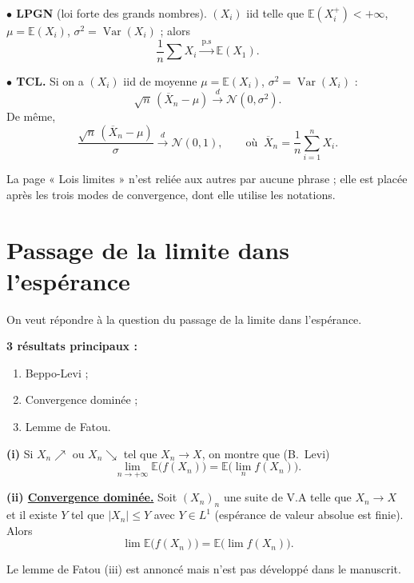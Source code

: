 \documentclass[11pt,a4paper]{article}
\newcommand{\EE}{\mathbb{E}}
\DeclareMathOperator{\Var}{Var}
\begin{document}
\textbf{\color{bleu}$\bullet$ LPGN} (loi forte des grands nombres). $(X_i)$ iid telle que $\EE(X_i^{+})<+\infty$, $\mu=\EE(X_i)$, $\sigma^2=\Var(X_i)$ ; alors
\[
  \frac1n\sum X_i\xrightarrow{\ \text{p.s}\ }\EE(X_1).
\]

\textbf{\color{bleu}$\bullet$ TCL.} Si on a $(X_i)$ iid de moyenne $\mu=\EE(X_i)$, $\sigma^2=\Var(X_i)$ :
\[
  \sqrt n\,(\overline X_n-\mu)\xrightarrow{\ d\ }\mathcal N(0,\sigma^2).
\]
De même,
\[
  \frac{\sqrt n\,(\overline X_n-\mu)}{\sigma}\xrightarrow{\ d\ }\mathcal N(0,1),\qquad\text{où }\ \overline X_n=\frac1n\sum_{i=1}^{n}X_i .
\]

\begin{note}
La page « Lois limites » n'est reliée aux autres par aucune phrase ; elle est placée après les trois modes de convergence, dont elle utilise les notations.
\end{note}

\section*{Passage de la limite dans l'espérance}

On veut répondre à la question du passage de la limite dans l'espérance.

\textbf{3 résultats principaux :}
\begin{enumerate}[label=\textbf{(\roman*)},leftmargin=1.2cm]
  \item Beppo-Levi ;
  \item Convergence dominée ;
  \item Lemme de Fatou.
\end{enumerate}

\textbf{(i)} Si $X_n\nearrow$ ou $X_n\searrow$ tel que $X_n\to X$, on montre que (B.~Levi)
\[
  \lim_{n\to+\infty}\EE\bigl(f(X_n)\bigr)=\EE\bigl(\lim_n f(X_n)\bigr).
\]

\textbf{(ii) \underline{Convergence dominée.}} Soit $(X_n)_n$ une suite de V.A telle que $X_n\to X$ et il existe $Y$ tel que $|X_n|\le Y$ avec $Y\in L^1$
(espérance de valeur absolue est finie). Alors
\[
  \lim\EE\bigl(f(X_n)\bigr)=\EE\bigl(\lim f(X_n)\bigr).
\]

\begin{note}
Le lemme de Fatou (iii) est annoncé mais n'est pas développé dans le manuscrit.
\end{note}

\end{document}
